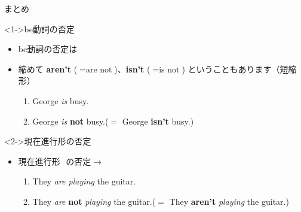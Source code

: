 \documentclass[aspectratio=169,xcolor={dvipsnames,table}]{beamer}
\begin{document}
\begin{frame}[plain]{まとめ}
 
       \begin{exampleblock}<1->{be動詞の否定}\small
\begin{itemize}
 \item  be動詞の否定は\,\,
 \item  縮めて {\bfseries aren't}\,\,($=\text{are not}$)、{\bfseries isn't}\,\,($=\text{is not}$) ということもあります（短縮形）
\begin{enumerate}
 \item George {\itshape is} busy.
 \item George {\itshape is} {\bfseries not} busy.($=$ George {\bfseries isn't} busy.)
\end{enumerate}


\end{itemize}
      \end{exampleblock}

\begin{exampleblock}<2->{現在進行形の否定}\small
\begin{itemize}
 \item  現在進行形\,\,\,\,の否定$\longrightarrow$\,\,%

\begin{enumerate}
 \item They {\itshape are playing} the guitar.
 \item They {\itshape are} {\bfseries not} {\itshape playing} the guitar.($=$ They {\bfseries aren't} {\itshape playing} the guitar.)
\end{enumerate}
\end{itemize}
      \end{exampleblock}

\hfill{}
\end{frame}
\end{document}
